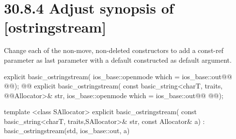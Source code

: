 \documentclass[ebook,11pt,article]{memoir}
\begin{document}
\section{30.8.4 Adjust synopsis of  [ostringstream]}
Change each of the non-move, non-deleted constructors to add a const-ref  parameter as last parameter with a default constructed  as default argument. 
\begin{codeblock}
explicit basic_ostringstream(
             ios_base::openmode which = ios_base::out@\added{,}@
             @@);
@@
explicit basic_ostringstream(
             const basic_string<charT, traits, @@Allocator>& str,
             ios_base::openmode which = ios_base::out@\added{,}@
             @@);
\end{codeblock}
\begin{addedblock}\begin{codeblock}
template <class SAllocator>
explicit basic_ostringstream(
             const basic_string<charT, traits,SAllocator>& str,
             const Allocator& a)
         : basic_ostringstream(std, ios_base::out, a) {}
\end{codeblock}\end{addedblock}

%
\end{document}
